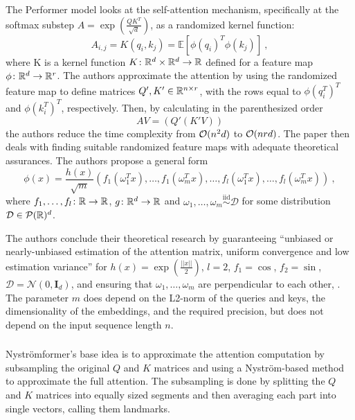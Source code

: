 The Performer model \citep{performer} looks at the self-attention mechanism, specifically at the softmax substep $A=\exp(\frac{QK^T}{\sqrt{d}})$, as a randomized kernel function: 
\begin{equation}
    A_{i,j}=K(q_i,k_j)=\mathbb{E}[\phi(q_i)^T\phi(k_j)]\ ,
\end{equation}
where K is a kernel function $K\colon\mathbb{R}^d\times\mathbb{R}^d\rightarrow\mathbb{R}$ defined for a feature map $\phi\colon\mathbb{R}^d\rightarrow\mathbb{R}^r$.
The authors approximate the attention by using the randomized feature map to define matrices $Q', K'\in\mathbb{R}^{n\times r}$, with the rows equal to $\phi(q_i^T)^T$ and $\phi(k_i^T)^T$, respectively.
Then, by calculating in the parenthesized order
\begin{equation}
        AV = (Q'(K'V))
\end{equation}
the authors reduce the time complexity from $\mathcal{O}(n^2d)$ to $\mathcal{O}(nrd)$.
The paper then deals with finding suitable randomized feature maps with adequate theoretical assurances. 
The authors propose a general form
\begin{equation}
        \phi(x)=\frac{h(x)}{\sqrt{m}}(f_1(\omega_1^Tx),\dots,f_1(\omega_m^Tx),
        \dots,f_l(\omega_1^Tx),\dots,f_l(\omega_m^Tx))\ ,
\end{equation}
where $f_1,\dots,f_l\colon\mathbb{R}\rightarrow\mathbb{R}$, $g\colon\mathbb{R}^d\rightarrow\mathbb{R}$ and $\omega_1,\dots,\omega_m\overset{\text{iid}}{\sim}\mathcal{D}$ for some distribution $\mathcal{D}\in\mathcal{P} ( \mathbb{R} )^d$.

The authors conclude their theoretical research by guaranteeing ``unbiased or nearly-unbiased estimation of the attention matrix, uniform convergence and low estimation variance'' for $h(x)=\exp(\frac{||x||}{2})$, $l=2$, $f_1=\cos$, $f_2=\sin$, $\mathcal{D}=\mathcal{N}(0,\textbf{I}_d)$, and ensuring that $\omega_1,\dots,\omega_m$ are perpendicular to each other, \citep[Theorem 4]{performer}.
The parameter $m$ does depend on the L2-norm of the queries and keys, the dimensionality of the embeddings, and the required precision, but does not depend on the input sequence length $n$.

\subsubsection{\nystr{}}

Nystr\"omformer's \citep{nystrom} base idea is to approximate the attention computation by subsampling the original $Q$ and $K$ matrices and using a Nystr\"om-based method \citep{nystrom-matrix-approx} to approximate the full attention. 
The subsampling is done by splitting the $Q$ and $K$ matrices into equally sized segments and then averaging each part into single vectors, calling them landmarks.

